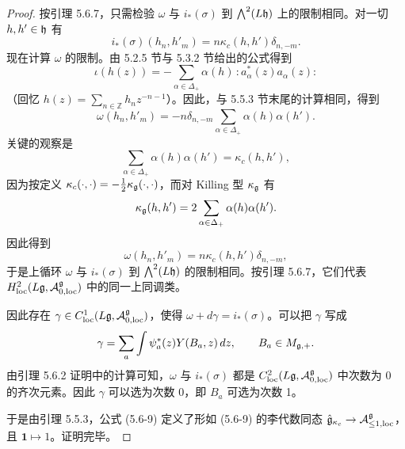 \begin{proof}
按引理 5.6.7，只需检验 $\omega$ 与 $i_*(\sigma)$ 到 $\bigwedge^2(L\mathfrak{h})$ 上的限制相同。对一切 $h,h'\in\mathfrak{h}$ 有
\[
i_*(\sigma)(h_n,h'_m) = n\kappa_c(h,h')\delta_{n,-m}.
\]
现在计算 $\omega$ 的限制。由 5.2.5 节与 5.3.2 节给出的公式得到
\begin{equation}
\iota(h(z)) = -\sum_{\alpha\in\Delta_+}\alpha(h)\,{:}a^*_\alpha(z)a_\alpha(z){:}
\tag{5.6-10}
\end{equation}
（回忆 $h(z) = \sum_{n\in\mathbb{Z}}h_nz^{-n-1}$）。因此，与 5.5.3 节末尾的计算相同，得到
\[
\omega(h_n,h'_m) = -n\delta_{n,-m}\sum_{\alpha\in\Delta_+}\alpha(h)\alpha(h').
\]
关键的观察是
\begin{equation}
\sum_{\alpha\in\Delta_+}\alpha(h)\alpha(h') = \kappa_c(h,h'),
\tag{5.6-11}
\end{equation}
因为按定义 $\kappa_c(\cdot,\cdot) = -\tfrac12\kappa_{\mathfrak{g}}(\cdot,\cdot)$，而对 Killing 型 $\kappa_{\mathfrak{g}}$ 有
\[
\kappa_{\mathfrak{g}}(h,h') = 2\sum_{\alpha\in\Delta_+}\alpha(h)\alpha(h').
\]
因此得到
\[
\omega(h_n,h'_m) = n\kappa_c(h,h')\delta_{n,-m},
\]
于是上循环 $\omega$ 与 $i_*(\sigma)$ 到 $\bigwedge^2(L\mathfrak{h})$ 的限制相同。按引理 5.6.7，它们代表 $H^2_{\mathrm{loc}}(L\mathfrak{g},\mathcal{A}^{\mathfrak{g}}_{0,\mathrm{loc}})$ 中的同一上同调类。

因此存在 $\gamma\in C^1_{\mathrm{loc}}(L\mathfrak{g},\mathcal{A}^{\mathfrak{g}}_{0,\mathrm{loc}})$，使得 $\omega+d\gamma = i_*(\sigma)$。可以把 $\gamma$ 写成
\[
\gamma = \sum_a\int\psi^*_a(z)Y(B_a,z)\,dz,\qquad B_a\in M_{\mathfrak{g},+}.
\]
由引理 5.6.2 证明中的计算可知，$\omega$ 与 $i_*(\sigma)$ 都是 $C^2_{\mathrm{loc}}(L\mathfrak{g},\mathcal{A}^{\mathfrak{g}}_{0,\mathrm{loc}})$ 中次数为 0 的齐次元素。因此 $\gamma$ 可以选为次数 0，即 $B_a$ 可选为次数 1。

于是由引理 5.5.3，公式 (5.6-9) 定义了形如 (5.6-9) 的李代数同态 $\hat{\mathfrak{g}}_{\kappa_c}\to\mathcal{A}^{\mathfrak{g}}_{\le1,\mathrm{loc}}$，且 $\mathbf{1}\mapsto 1$。证明完毕。
\end{proof}

